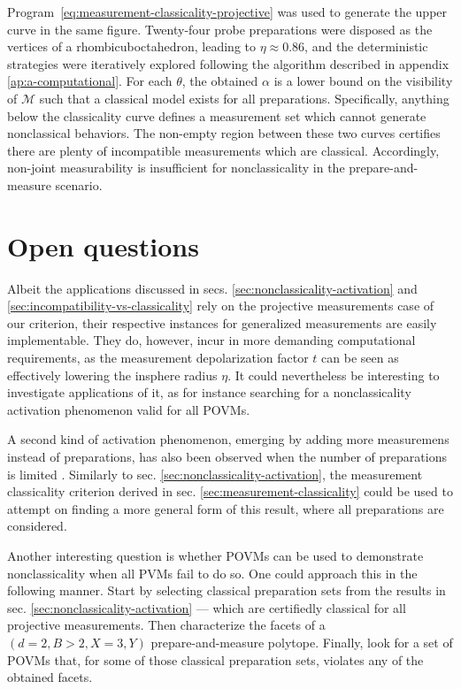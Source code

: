             Program~\eqref{eq:measurement-classicality-projective} was used to generate the upper curve in the same figure. Twenty-four probe preparations were disposed as the vertices of a rhombicuboctahedron, leading to $\eta \approx 0.86$, and the deterministic strategies were iteratively explored following the algorithm described in appendix \ref{ap:a-computational}. For each $\theta$, the obtained $\alpha$ is a lower bound on the visibility of $\mathcal{M}$ such that a classical model exists for all preparations. Specifically, anything below the classicality curve defines a measurement set which cannot generate nonclassical behaviors. The non-empty region between these two curves certifies there are plenty of incompatible measurements which are classical. Accordingly, non-joint measurability is insufficient for nonclassicality in the prepare-and-measure scenario.


        \section{Open questions}

        Albeit the applications discussed in secs. \ref{sec:nonclassicality-activation} and \ref{sec:incompatibility-vs-classicality} rely on the projective measurements case of our criterion, their respective instances for generalized measurements are easily implementable. They do, however, incur in more demanding computational requirements, as the measurement depolarization factor $t$ can be seen as effectively lowering the insphere radius $\eta$. It could nevertheless be interesting to investigate applications of it, as for instance searching for a nonclassicality activation phenomenon valid for all POVMs.

        A second kind of activation phenomenon, emerging by adding more measuremens instead of preparations, has also been observed when the number of preparations is limited \cite{poderini_pamcriteria_2020}. Similarly to sec. \ref{sec:nonclassicality-activation}, the measurement classicality criterion derived in sec. \ref{sec:measurement-classicality} could be used to attempt on finding a more general form of this result, where all preparations are considered.

        Another interesting question is whether POVMs can be used to demonstrate nonclassicality when all PVMs fail to do so. One could approach this in the following manner. Start by selecting classical preparation sets from the results in sec. \ref{sec:nonclassicality-activation} --- which are certifiedly classical for all projective measurements. Then characterize the facets of a $(d=2, B>2, X=3,Y)$ prepare-and-measure polytope. Finally, look for a set of POVMs that, for some of those classical preparation sets, violates any of the obtained facets.

